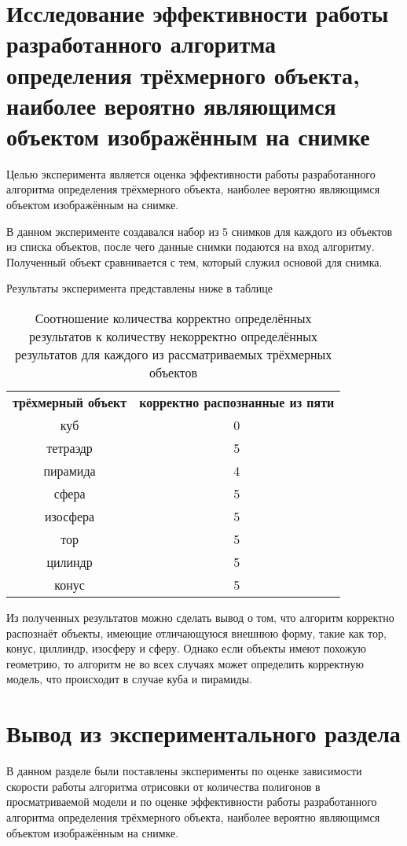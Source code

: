 \section{Исследование эффективности работы разработанного алгоритма определения трёхмерного объекта, наиболее вероятно являющимся объектом изображённым на снимке}
Целью эксперимента является оценка эффективности работы разработанного алгоритма определения трёхмерного объекта, наиболее вероятно являющимся объектом изображённым на снимке.

В данном эксперименте создавался набор из 5 снимков для каждого из объектов из списка объектов, после чего данные снимки подаются на вход алгоритму. Полученный объект сравнивается с тем, который служил основой для снимка.

Результаты эксперимента представлены ниже в таблице 

\begin{table}[H]
  \begin{center}
    \captionsetup{justification=raggedright}
     \caption{Соотношение количества корректно определённых результатов к количеству некорректно определённых результатов для каждого из рассматриваемых трёхмерных объектов}
    \label{tab:res_1}
    \begin{tabular}{c|c}
      \textbf{трёхмерный объект} & \textbf{корректно распознанные из пяти}\\
	куб & 0\\
	тетраэдр & 5\\
	пирамида & 4\\
	сфера & 5\\
	изосфера & 5\\
	тор & 5\\
	цилиндр & 5\\
	конус & 5\\
      \hline	
    \end{tabular}
  \end{center}
\end{table}

Из полученных результатов можно сделать вывод о том, что алгоритм корректно распознаёт объекты, имеющие отличающуюся внешнюю форму, такие как тор, конус, циллиндр, изосферу и сферу. Однако если объекты имеют похожую геометрию, то алгоритм не во всех случаях может определить корректную модель, что происходит в случае куба и пирамиды.

\section{Вывод из экспериментального раздела}
В данном разделе были поставлены эксперименты по оценке зависимости скорости работы алгоритма отрисовки от количества полигонов в просматриваемой модели и по оценке эффективности работы разработанного алгоритма определения трёхмерного объекта, наиболее вероятно являющимся объектом изображённым на снимке. 

